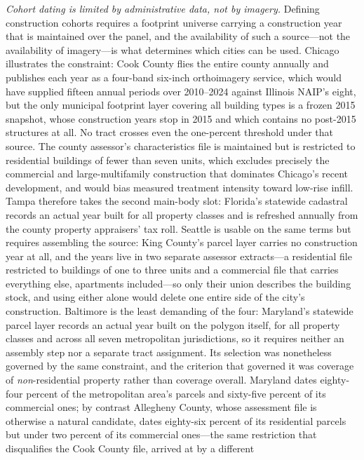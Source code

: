 \documentclass[conference]{IEEEtran}
\begin{document}
\emph{Cohort dating is limited by administrative data, not by imagery.} Defining
construction cohorts requires a footprint universe carrying a construction year
that is maintained over the panel, and the availability of such a source---not
the availability of imagery---is what determines which cities can be used. Chicago
illustrates the constraint: Cook County flies the entire county annually and
publishes each year as a four-band six-inch orthoimagery service, which would
have supplied fifteen annual periods over 2010--2024 against Illinois NAIP's
eight, but the only municipal footprint layer covering all building types is a
frozen 2015 snapshot, whose construction years stop in 2015 and which contains no
post-2015 structures at all. No tract crosses even the one-percent threshold under
that source. The county assessor's characteristics file is maintained but is
restricted to residential buildings of fewer than seven units, which excludes
precisely the commercial and large-multifamily construction that dominates
Chicago's recent development, and would bias measured treatment intensity toward
low-rise infill. Tampa therefore takes the second main-body slot: Florida's
statewide cadastral records an actual year built for all property classes and is
refreshed annually from the county property appraisers' tax roll. Seattle is
usable on the same terms but requires assembling the source: King County's parcel
layer carries no construction year at all, and the years live in two separate
assessor extracts---a residential file restricted to buildings of one to three
units and a commercial file that carries everything else, apartments included---so
only their union describes the building stock, and using either alone would delete
one entire side of the city's construction. Baltimore is the least demanding of the
four: Maryland's statewide parcel layer records an actual year built on the polygon
itself, for all property classes and across all seven metropolitan jurisdictions,
so it requires neither an assembly step nor a separate tract assignment. Its
selection was nonetheless governed by the same constraint, and the criterion that
governed it was coverage of \emph{non}-residential property rather than coverage
overall. Maryland dates eighty-four percent of the metropolitan area's parcels and
sixty-five percent of its commercial ones; by contrast Allegheny County, whose
assessment file is otherwise a natural candidate, dates eighty-six percent of its
residential parcels but under two percent of its commercial ones---the same
restriction that disqualifies the Cook County file, arrived at by a different
\end{document}

